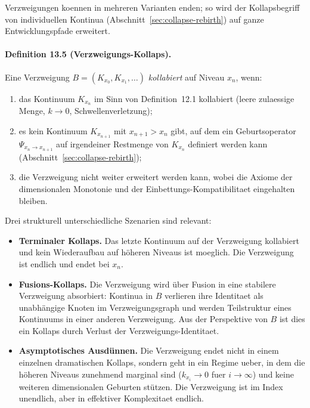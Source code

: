 Verzweigungen koennen in mehreren Varianten enden; so wird der Kollapsbegriff von
individuellen Kontinua (Abschnitt~\ref{sec:collapse-rebirth}) auf ganze
Entwicklungspfade erweitert.

\paragraph{Definition 13.5 (Verzweigungs-Kollaps).}
Eine Verzweigung \(B = (K_{x_0}, K_{x_1}, \dots)\) \emph{kollabiert} auf Niveau
\(x_n\), wenn:
\begin{enumerate}
  \item das Kontinuum \(K_{x_n}\) im Sinn von Definition~12.1 kollabiert
        (leere zulaessige Menge, \(k\to 0\), Schwellenverletzung);
  \item es kein Kontinuum \(K_{x_{n+1}}\) mit \(x_{n+1}>x_n\) gibt, auf
        dem ein Geburtsoperator \(\Psi_{x_n\to x_{n+1}}\) auf irgendeiner Restmenge
        von \(K_{x_n}\) definiert werden kann
        (Abschnitt~\ref{sec:collapse-rebirth});
  \item die Verzweigung nicht weiter erweitert werden kann, wobei die Axiome der
        dimensionalen Monotonie und der Einbettungs-Kompatibilitaet eingehalten
        bleiben.
\end{enumerate}

Drei strukturell unterschiedliche Szenarien sind relevant:

\begin{itemize}
  \item \textbf{Terminaler Kollaps.}\quad
        Das letzte Kontinuum auf der Verzweigung kollabiert und kein
        Wiederaufbau auf höheren Niveaus ist moeglich. Die Verzweigung ist
        endlich und endet bei \(x_n\).
  \item \textbf{Fusions-Kollaps.}\quad
        Die Verzweigung wird über Fusion in eine stabilere Verzweigung absorbiert:
        Kontinua in \(B\) verlieren ihre Identitaet als unabhängige Knoten im
        Verzweigungsgraph und werden Teilstruktur eines Kontinuums in einer
        anderen Verzweigung. Aus der Perspektive von \(B\) ist dies ein
        Kollaps durch Verlust der Verzweigungs-Identitaet.
  \item \textbf{Asymptotisches Ausdünnen.}\quad
        Die Verzweigung endet nicht in einem einzelnen dramatischen Kollaps,
        sondern geht in ein Regime ueber, in dem die höheren Niveaus zunehmend
        marginal sind (\(k_{x_i}\to 0\) fuer \(i\to\infty\)) und keine
        weiteren dimensionalen Geburten stützen. Die Verzweigung ist im Index
        unendlich, aber in effektiver Komplexitaet endlich.
\end{itemize}

